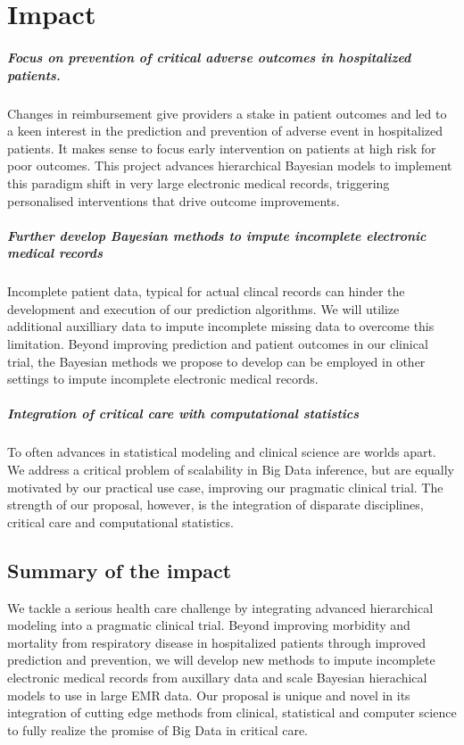 \documentclass[]{article}
\begin{document}
\section{Impact}\label{impact}

\subparagraph{Focus on prevention of critical adverse outcomes in
hospitalized
patients.}\label{focus-on-prevention-of-critical-adverse-outcomes-in-hospitalized-patients.}

Changes in reimbursement give providers a stake in patient outcomes and
led to a keen interest in the prediction and prevention of adverse event
in hospitalized patients. It makes sense to focus early intervention on
patients at high risk for poor outcomes. This project advances
hierarchical Bayesian models to implement this paradigm shift in very
large electronic medical records, triggering personalised interventions
that drive outcome improvements.

\subparagraph{Further develop Bayesian methods to impute incomplete
electronic medical
records}\label{further-develop-bayesian-methods-to-impute-incomplete-electronic-medical-records}

Incomplete patient data, typical for actual clincal records can hinder
the development and execution of our prediction algorithms. We will
utilize additional auxilliary data to impute incomplete missing data to
overcome this limitation. Beyond improving prediction and patient
outcomes in our clinical trial, the Bayesian methods we propose to
develop can be employed in other settings to impute incomplete
electronic medical records.

\subparagraph{Integration of critical care with computational
statistics}\label{integration-of-critical-care-with-computational-statistics}

To often advances in statistical modeling and clinical science are
worlds apart. We address a critical problem of scalability in Big Data
inference, but are equally motivated by our practical use case,
improving our pragmatic clinical trial. The strength of our proposal,
however, is the integration of disparate disciplines, critical care and
computational statistics.

\subsection{Summary of the impact}\label{summary-of-the-impact}

We tackle a serious health care challenge by integrating advanced
hierarchical modeling into a pragmatic clinical trial. Beyond improving
morbidity and mortality from respiratory disease in hospitalized
patients through improved prediction and prevention, we will develop new
methods to impute incomplete electronic medical records from auxillary
data and scale Bayesian hierachical models to use in large EMR data. Our
proposal is unique and novel in its integration of cutting edge methods
from clinical, statistical and computer science to fully realize the
promise of Big Data in critical care.
\end{document}
